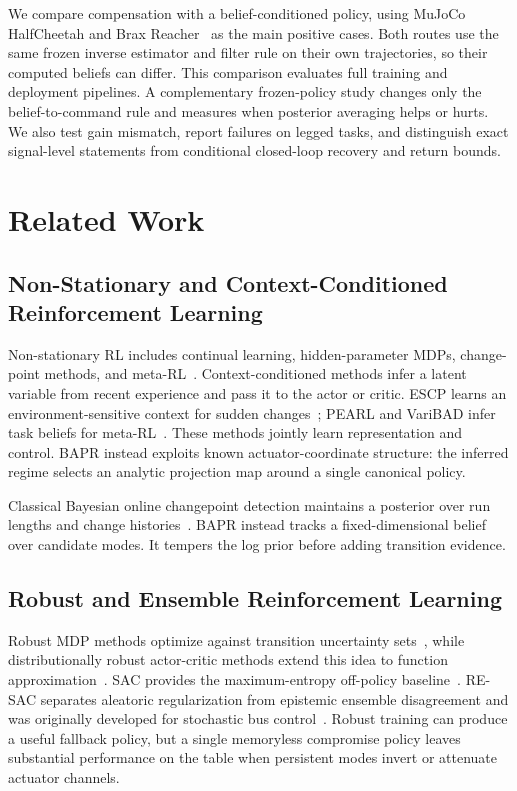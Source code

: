 \documentclass[twoside,11pt]{article}
\begin{document}
We compare compensation with a belief-conditioned policy, using MuJoCo HalfCheetah and Brax Reacher~\citep{Freeman2021Brax} as the main positive cases. Both routes use the same frozen inverse estimator and filter rule on their own trajectories, so their computed beliefs can differ. This comparison evaluates full training and deployment pipelines. A complementary frozen-policy study changes only the belief-to-command rule and measures when posterior averaging helps or hurts. We also test gain mismatch, report failures on legged tasks, and distinguish exact signal-level statements from conditional closed-loop recovery and return bounds.

\section{Related Work}

\subsection{Non-Stationary and Context-Conditioned Reinforcement Learning}

Non-stationary RL includes continual learning, hidden-parameter MDPs, change-point methods, and meta-RL~\citep{Khetarpal2020ContinualRL,Doshi-Velez2016HiPMDP,Adams2007BOCD,Nagabandi2019MAML}. Context-conditioned methods infer a latent variable from recent experience and pass it to the actor or critic. ESCP learns an environment-sensitive context for sudden changes~\citep{Luo2022ESCP}; PEARL and VariBAD infer task beliefs for meta-RL~\citep{Rakelly2019PEARL,Zintgraf2020VariBAD}. These methods jointly learn representation and control. BAPR instead exploits known actuator-coordinate structure: the inferred regime selects an analytic projection map around a single canonical policy.

Classical Bayesian online changepoint detection maintains a posterior over run lengths and change histories~\citep{Adams2007BOCD}. BAPR instead tracks a fixed-dimensional belief over candidate modes. It tempers the log prior before adding transition evidence.

\subsection{Robust and Ensemble Reinforcement Learning}

Robust MDP methods optimize against transition uncertainty sets~\citep{Iyengar2005RobustDP,Wiesemann2013RobustMDP}, while distributionally robust actor-critic methods extend this idea to function approximation~\citep{Zhou2023NaturalActorCritic,Panaganti2024RobustF}. SAC provides the maximum-entropy off-policy baseline~\citep{Haarnoja2018SAC}. RE-SAC separates aleatoric regularization from epistemic ensemble disagreement and was originally developed for stochastic bus control~\citep{Zhang2026RESAC}. Robust training can produce a useful fallback policy, but a single memoryless compromise policy leaves substantial performance on the table when persistent modes invert or attenuate actuator channels.
\end{document}
